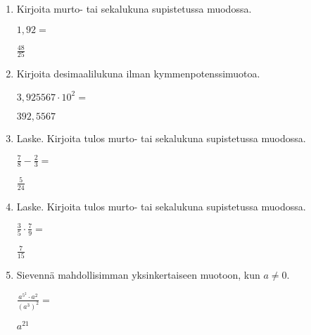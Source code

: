 \documentclass[finnish, a4paper, 12pt]{article}
\begin{document}
	\begin{enumerate}[leftmargin=*]
		\setlength\itemsep{1em}
		
		\item %
		Kirjoita murto- tai sekalukuna supistetussa muodossa. 
		
		\(
		1{,}92 = 
		\) %
		
		\begin{version:withAnswers}
		\( \frac{48}{25} \)
		\end{version:withAnswers}

		\vspace{8pt}
		
		\item %
		Kirjoita desimaalilukuna ilman kymmenpotenssimuotoa. 
		
		\(
		3{,}925567\cdot 10^{2} = 
		\) %
		\begin{version:withAnswers}
		\( 392,5567 \)
		\end{version:withAnswers}	
		\vspace{8pt}
		
		\item %
		Laske. Kirjoita tulos murto- tai sekalukuna supistetussa muodossa.
		
		\(
		\displaystyle
		\frac{7}{8}-\frac{2}{3} = 
		\) %
		\begin{version:withAnswers}
		\( \frac{5}{24} \)
		\end{version:withAnswers}	
		
		\vspace{8pt}
		
		\item %
		Laske. Kirjoita tulos murto- tai sekalukuna supistetussa muodossa.
		
		\(
		\displaystyle
		\frac{3}{5}\cdot\frac{7}{9} = 
		\) %
		\begin{version:withAnswers}
		\( \frac{7}{15} \)
		\end{version:withAnswers}
		
		\vspace{8pt}
		
		\item %
		Sievennä mahdollisimman yksinkertaiseen muotoon, kun \(a \not = 0\). 
		
		\(
		\displaystyle
		\frac{a^{5^2}\cdot a^2}{\left(a^3\right)^2} =
		\phantom{mmmmmmmmmmmmmmm}
		\) %
		\begin{version:withAnswers}
		\(  a^{21} \)
		\end{version:withAnswers}
		

\end{enumerate}
\end{document}
